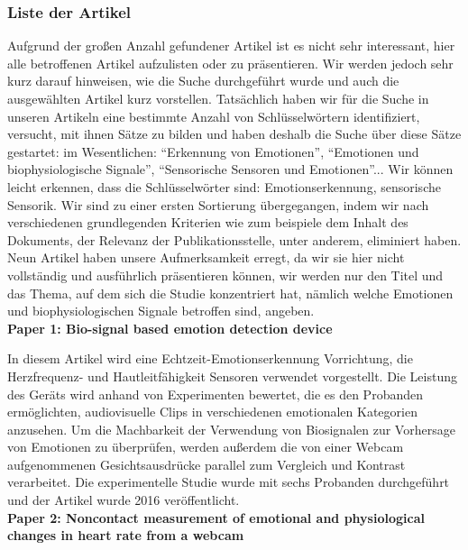 \subsubsection{Liste der Artikel}

Aufgrund der großen Anzahl gefundener Artikel ist es nicht sehr interessant, hier alle betroffenen Artikel aufzulisten oder zu präsentieren. 
Wir werden jedoch sehr kurz darauf hinweisen, wie die Suche durchgeführt wurde und auch die ausgewählten Artikel kurz vorstellen.
Tatsächlich haben wir für die Suche in unseren Artikeln eine bestimmte Anzahl von Schlüsselwörtern identifiziert, versucht, mit ihnen Sätze zu bilden und haben deshalb die Suche über diese Sätze gestartet: im Wesentlichen: 
``Erkennung von Emotionen'', ``Emotionen und biophysiologische Signale'', ``Sensorische Sensoren und Emotionen''...
Wir können leicht erkennen, dass die Schlüsselwörter sind: 
Emotionserkennung, sensorische Sensorik.
Wir sind zu einer ersten Sortierung übergegangen, indem wir nach verschiedenen grundlegenden Kriterien wie zum beispiele dem Inhalt des Dokuments, der Relevanz der Publikationsstelle, unter anderem, eliminiert haben.
Neun Artikel haben unsere Aufmerksamkeit erregt, da wir sie hier nicht vollständig und ausführlich präsentieren können, wir werden nur den Titel und das Thema, auf dem sich die Studie konzentriert hat, nämlich welche Emotionen und biophysiologischen Signale betroffen sind, angeben. \\


\textbf{Paper 1: Bio-signal based emotion detection device}

In diesem Artikel wird eine Echtzeit-Emotionserkennung Vorrichtung, die Herzfrequenz- und Hautleitfähigkeit Sensoren verwendet vorgestellt. 
Die Leistung des Geräts wird anhand von Experimenten bewertet, die es den Probanden ermöglichten, audiovisuelle Clips in verschiedenen emotionalen Kategorien anzusehen. 
Um die Machbarkeit der Verwendung von Biosignalen zur Vorhersage von Emotionen zu überprüfen, werden außerdem die von einer Webcam aufgenommenen Gesichtsausdrücke parallel zum Vergleich und Kontrast verarbeitet. 
Die experimentelle Studie wurde mit sechs Probanden durchgeführt und der Artikel wurde 2016 veröffentlicht. \\


\textbf{Paper 2: Noncontact measurement of emotional and physiological changes in heart rate from a webcam}

